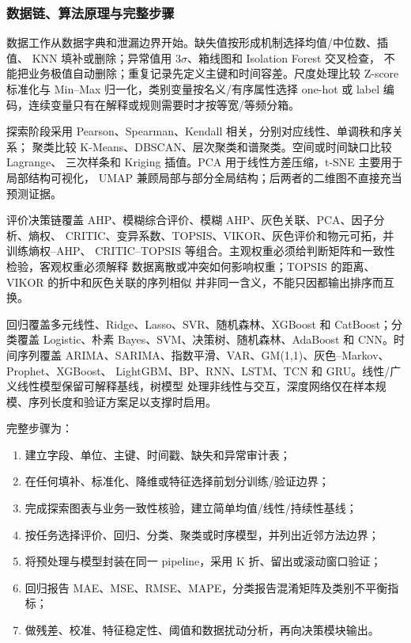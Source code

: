 \subsubsection{数据链、算法原理与完整步骤}

数据工作从数据字典和泄漏边界开始。缺失值按形成机制选择均值/中位数、插值、
KNN 填补或删除；异常值用 $3\sigma$、箱线图和 Isolation Forest 交叉检查，
不能把业务极值自动删除；重复记录先定义主键和时间容差。尺度处理比较
Z-score 标准化与 Min--Max 归一化，类别变量按名义/有序属性选择 one-hot 或
label 编码，连续变量只有在解释或规则需要时才按等宽/等频分箱。

探索阶段采用 Pearson、Spearman、Kendall 相关，分别对应线性、单调秩和序关系；
聚类比较 K-Means、DBSCAN、层次聚类和谱聚类。空间或时间缺口比较 Lagrange、
三次样条和 Kriging 插值。PCA 用于线性方差压缩，t-SNE 主要用于局部结构可视化，
UMAP 兼顾局部与部分全局结构；后两者的二维图不直接充当预测证据。

评价决策链覆盖 AHP、模糊综合评价、模糊 AHP、灰色关联、PCA、因子分析、熵权、
CRITIC、变异系数、TOPSIS、VIKOR、灰色评价和物元可拓，并训练熵权--AHP、
CRITIC--TOPSIS 等组合。主观权重必须给判断矩阵和一致性检验，客观权重必须解释
数据离散或冲突如何影响权重；TOPSIS 的距离、VIKOR 的折中和灰色关联的序列相似
并非同一含义，不能只因都输出排序而互换。

回归覆盖多元线性、Ridge、Lasso、SVR、随机森林、XGBoost 和 CatBoost；分类覆盖
Logistic、朴素 Bayes、SVM、决策树、随机森林、AdaBoost 和 CNN。时间序列覆盖
ARIMA、SARIMA、指数平滑、VAR、GM(1,1)、灰色--Markov、Prophet、XGBoost、
LightGBM、BP、RNN、LSTM、TCN 和 GRU。线性/广义线性模型保留可解释基线，树模型
处理非线性与交互，深度网络仅在样本规模、序列长度和验证方案足以支撑时启用。

完整步骤为：
\begin{enumerate}
  \item 建立字段、单位、主键、时间戳、缺失和异常审计表；
  \item 在任何填补、标准化、降维或特征选择前划分训练/验证边界；
  \item 完成探索图表与业务一致性核验，建立简单均值/线性/持续性基线；
  \item 按任务选择评价、回归、分类、聚类或时序模型，并列出近邻方法边界；
  \item 将预处理与模型封装在同一 pipeline，采用 K 折、留出或滚动窗口验证；
  \item 回归报告 MAE、MSE、RMSE、MAPE，分类报告混淆矩阵及类别不平衡指标；
  \item 做残差、校准、特征稳定性、阈值和数据扰动分析，再向决策模块输出。
\end{enumerate}

